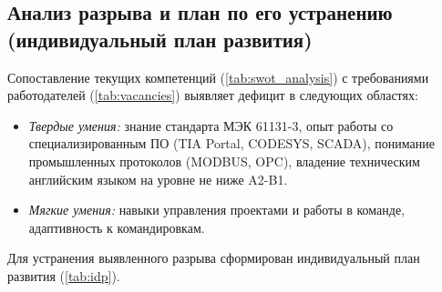 
\subsection{Анализ разрыва и план по его устранению (индивидуальный план развития)}

Сопоставление текущих компетенций (\cref{tab:swot_analysis}) с требованиями работодателей (\cref{tab:vacancies}) выявляет дефицит в следующих областях:
\begin{itemize}
    \item \textit{Твердые умения:} знание стандарта МЭК 61131-3, опыт работы со специализированным ПО (TIA Portal, CODESYS, SCADA), понимание промышленных протоколов (MODBUS, OPC), владение техническим английским языком на уровне не ниже A2-B1.
    \item \textit{Мягкие умения:} навыки управления проектами и работы в команде, адаптивность к командировкам.
\end{itemize}

Для устранения выявленного разрыва сформирован индивидуальный план развития (\cref{tab:idp}).

